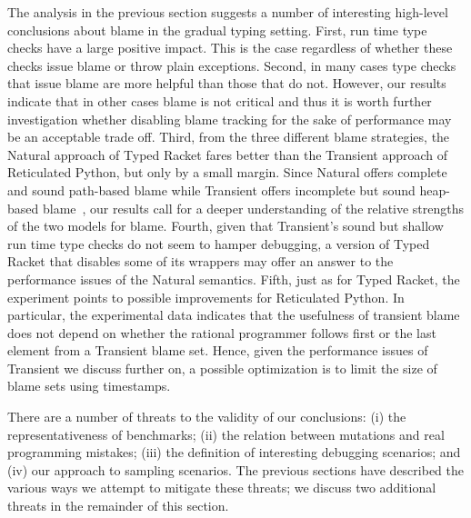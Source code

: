 



The analysis in the previous section suggests a number of interesting
high-level conclusions about blame in the gradual typing setting.  First,
run time type checks have a large positive impact. This is the case
regardless of whether these checks issue blame or throw plain exceptions.
Second, in many cases type checks that issue blame are more helpful than
those that do not. However, our results indicate that in other cases blame
is not critical and thus it is worth further investigation whether
disabling blame tracking for the sake of performance may be   an
acceptable trade off. Third, from the three different blame strategies, the
Natural approach of Typed Racket fares better than the Transient approach
of Reticulated Python, but only by a small margin. Since Natural offers complete
and sound path-based blame while Transient offers incomplete but sound heap-based
blame~\cite{gfd-oopsla-2019}, our results call for a deeper understanding
of the relative strengths of the two models for blame.  Fourth, given that
Transient's sound but shallow run time type checks do not seem to hamper
debugging, a version of Typed Racket that disables some of its wrappers
may offer an answer to the performance issues of the Natural semantics. 
Fifth, just as for Typed Racket, the experiment points to possible
improvements for Reticulated Python. In particular, the experimental 
data indicates that the usefulness of transient blame does not depend on
whether  the rational programmer follows first or the last element from a
Transient blame set. Hence, given the performance issues of Transient we discuss further on, 
a possible optimization is to limit the size of blame sets
using timestamps.

There are a number of threats to the validity of our conclusions: (i) the
representativeness of benchmarks; (ii) the relation between mutations and
real programming mistakes; (iii) the definition of interesting debugging
scenarios; and (iv) our approach to sampling scenarios. The previous sections
have described the various ways we attempt to mitigate these threats;
we discuss two additional threats in the remainder of this section.


